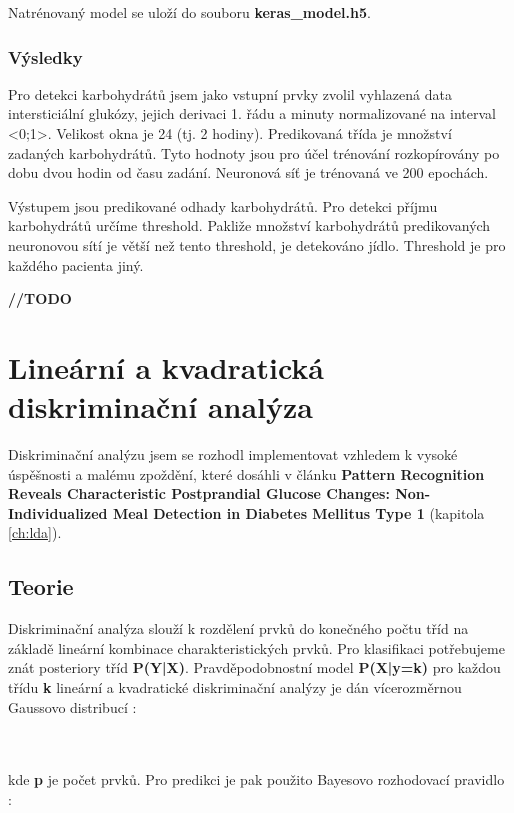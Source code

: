 Natrénovaný model se uloží do souboru \textbf{keras\_model.h5}.

\subsubsection{Výsledky}

Pro detekci karbohydrátů jsem jako vstupní prvky zvolil vyhlazená data intersticiální glukózy, jejich derivaci 1. řádu a minuty normalizované na interval <0;1>. Velikost okna je 24 (tj. 2 hodiny). Predikovaná třída je množství zadaných karbohydrátů. Tyto hodnoty jsou pro účel trénování rozkopírovány po dobu dvou hodin od času zadání. Neuronová síť je trénovaná ve 200 epochách.

Výstupem jsou predikované odhady karbohydrátů. Pro detekci příjmu karbohydrátů určíme threshold. Pakliže množství karbohydrátů predikovaných neuronovou sítí je větší než tento threshold, je detekováno jídlo. Threshold je pro každého pacienta jiný.

\textbf{//TODO}

\section{Lineární a kvadratická diskriminační analýza}
\label{ch:lda_qda}

Diskriminační analýzu jsem se rozhodl implementovat vzhledem k vysoké úspěšnosti a malému zpoždění, které dosáhli \citet{Analyza.LDA} v článku \textbf{Pattern Recognition Reveals Characteristic Postprandial Glucose Changes: Non-Individualized Meal Detection in Diabetes Mellitus Type 1} (kapitola \ref{ch:lda}).

\subsection{Teorie}
Diskriminační analýza slouží k rozdělení prvků do konečného počtu tříd na základě lineární kombinace charakteristických prvků. Pro klasifikaci potřebujeme znát posteriory tříd \textbf{P(Y|X)}. Pravděpodobnostní model \textbf{P(X|y=k)} pro každou třídu \textbf{k} lineární a kvadratické diskriminační analýzy je dán vícerozměrnou Gaussovo distribucí \citep{cho.book.lda}:

\\\\
kde \textbf{p} je počet prvků. Pro predikci je pak použito Bayesovo rozhodovací pravidlo \citep{cho.book.lda}:

